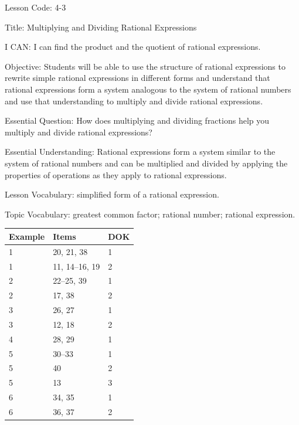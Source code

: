 \documentclass{article}
\newenvironment{lesson-meta}{}{}        %
\newenvironment{item-analysis}{}{}      %
\begin{document}
\begin{lesson-meta}
Lesson Code: 4-3

Title: Multiplying and Dividing Rational Expressions

I CAN: I can find the product and the quotient of rational expressions.

Objective: Students will be able to use the structure of rational expressions to rewrite simple rational expressions in different forms and understand that rational expressions form a system analogous to the system of rational numbers and use that understanding to multiply and divide rational expressions.

Essential Question: How does multiplying and dividing fractions help you multiply and divide rational expressions?

Essential Understanding: Rational expressions form a system similar to the system of rational numbers and can be multiplied and divided by applying the properties of operations as they apply to rational expressions.

Lesson Vocabulary: simplified form of a rational expression.

Topic Vocabulary: greatest common factor; rational number; rational expression.
\end{lesson-meta}

\begin{item-analysis}
\begin{tabular}{lll}
\toprule
Example & Items & DOK \\
\midrule
1 & 20, 21, 38 & 1 \\
1 & 11, 14--16, 19 & 2 \\
2 & 22--25, 39 & 1 \\
2 & 17, 38 & 2 \\
3 & 26, 27 & 1 \\
3 & 12, 18 & 2 \\
4 & 28, 29 & 1 \\
5 & 30--33 & 1 \\
5 & 40 & 2 \\
5 & 13 & 3 \\
6 & 34, 35 & 1 \\
6 & 36, 37 & 2 \\
\bottomrule
\end{tabular}
\end{item-analysis}
\end{document}
